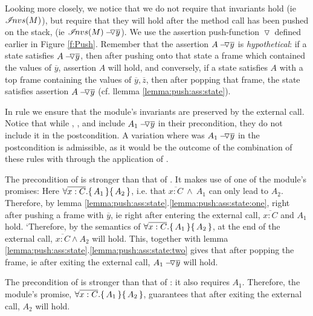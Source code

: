 {{Looking more closely, we notice  that we do not require that invariants hold (ie ${\extract{M}}$), but require that they will hold after the method call has been pushed on the stack, (ie $  \PushAS {y}{\extract{M}}$). We use the  assertion push-function $\pushSymbol$   defined earlier in Figure \ref{f:Push}.}
Remember that the assertion $\PushAS y A$ is \emph{hypothetical}: if a state satisfies $\PushAS y A$, then after pushing
onto that state a frame which contained the values  of $\overline y$, assertion $A$ will hold, and conversely,   if a state satisfies  $A$ with a top frame containing the  values of $\overline y, \overline z$, then  after popping that frame, the state  satisfies assertion  $\PushAS y A$ (cf. llemma \ref{lemma:push:ass:state}).
 
 {In rule {} we   ensure that the module's invariants are preserved by the external call. } {Notice that while  {}, {}, {} and {}    include 
 $\PushAS y {A_1}$ in their precondition,  they do not include it in the postcondition. A variation where was  $\PushAS y {A_1}$ in the postcondition is admissible, as it would be the outcome of the combination of these rules with  {} through the application of {}.}
 
{The precondition of {} is stronger than that of {}. It makes use of one of the  module's  promises: Here $  {\TwoStatesQ {\overline {x:C}} {A_1}{A_2}}$, i.e. that  $\overline {x:C} \ \wedge\ A_1$ can only lead to $A_2$. 
 Therefore, by lemma \ref{lemma:push:ass:state}.\ref{lemma:push:ass:state:one}, right after pushing a frame with $\overline y$, ie right after  entering the external call, $\overline {x:C}$ and  $A_1$ hold. `Therefore, by the semantics of $  {\TwoStatesQ {\overline {x:C}} {A_1}{A_2}}$, at the end of the external call,  $\overline {x:C} \wedge A_2$ will hold. This, together with  lemma \ref{lemma:push:ass:state}.\ref{lemma:push:ass:state:two} gives that after popping the frame, ie after  exiting the external call, $\PushAS y {A_1}$ will hold.}


{The precondition of {} is stronger than that of {}: it also requires $A_1$. Therefore, the module's promise, $  {\TwoStatesQ {\overline {x:C}} {A_1}{A_2}}$, guarantees that after exiting the external call, $A_2$ will hold.}
 





}
